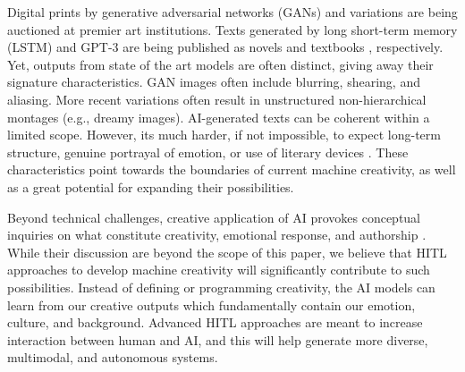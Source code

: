 \documentclass[letterpaper]{article} %
\begin{document}
Digital prints by generative adversarial networks (GANs) \cite{Goodfellow2014} and variations are being auctioned \cite{GANEdmondBelamy} at premier art institutions. Texts generated by long short-term memory (LSTM) \cite{Hochreiter1997} and GPT-3 \cite{Brown2020} are being published as novels \cite{Goodwin2018} and textbooks \cite{BetaWriter2019}, respectively. Yet, outputs from state of the art models are often distinct, giving away their signature characteristics. GAN images often include blurring, shearing, and aliasing. More recent variations often result in unstructured non-hierarchical montages (e.g., dreamy images). AI-generated texts can be coherent within a limited scope. However, its much harder, if not impossible, to expect long-term structure, genuine portrayal of emotion, or use of literary devices \cite{Heerden2021}. These characteristics point towards the boundaries of current machine creativity, as well as a great potential for expanding their possibilities.

Beyond technical challenges, creative application of AI provokes conceptual inquiries on what constitute creativity, emotional response, and authorship \cite{Wilson1983, Boden1996, Manovich2019}. While their discussion are beyond the scope of this paper, we believe that HITL approaches to develop machine creativity will significantly contribute to such possibilities. Instead of defining or programming creativity, the AI models can learn from our creative outputs which fundamentally contain our emotion, culture, and background. Advanced HITL approaches are meant to increase interaction between human and AI, and this will help generate more diverse, multimodal, and autonomous systems.
\end{document}
